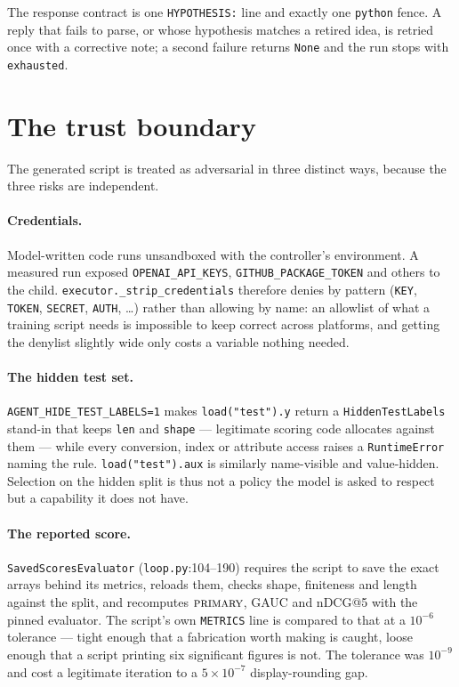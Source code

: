 \documentclass[11pt,a4paper]{article}
\newcommand{\code}[1]{\texttt{#1}}
\newcommand{\file}[1]{\texttt{#1}}
\newcommand{\primary}{\textsc{primary}}
\begin{document}
The response contract is one \code{HYPOTHESIS:} line and exactly one \code{python} fence. A reply
that fails to parse, or whose hypothesis matches a retired idea, is retried once with a corrective
note; a second failure returns \code{None} and the run stops with \code{exhausted}.

\section{The trust boundary}
\label{sec:trust}

The generated script is treated as adversarial in three distinct ways, because the three risks are
independent.

\paragraph{Credentials.} Model-written code runs unsandboxed with the controller's environment.
A measured run exposed \code{OPENAI\_API\_KEYS}, \code{GITHUB\_PACKAGE\_TOKEN} and others to the
child. \code{executor.\_strip\_credentials} therefore denies by pattern
(\code{KEY}, \code{TOKEN}, \code{SECRET}, \code{AUTH}, \dots) rather than allowing by name: an
allowlist of what a training script needs is impossible to keep correct across platforms, and
getting the denylist slightly wide only costs a variable nothing needed.

\paragraph{The hidden test set.} \code{AGENT\_HIDE\_TEST\_LABELS=1} makes
\code{load("test").y} return a \code{HiddenTestLabels} stand-in that keeps \code{len} and
\code{shape} --- legitimate scoring code allocates against them --- while every conversion,
index or attribute access raises a \code{RuntimeError} naming the rule. \code{load("test").aux}
is similarly name-visible and value-hidden. Selection on the hidden split is thus not a policy the
model is asked to respect but a capability it does not have.

\paragraph{The reported score.} \code{SavedScoresEvaluator} (\file{loop.py}:104--190) requires the
script to save the exact arrays behind its metrics, reloads them, checks shape, finiteness and
length against the split, and recomputes $\primary$, GAUC and nDCG@5 with the pinned evaluator. The
script's own \code{METRICS} line is compared to that at a $10^{-6}$ tolerance --- tight enough that
a fabrication worth making is caught, loose enough that a script printing six significant figures
is not. The tolerance was $10^{-9}$ and cost a legitimate iteration to a $5\times10^{-7}$
display-rounding gap.
\end{document}
